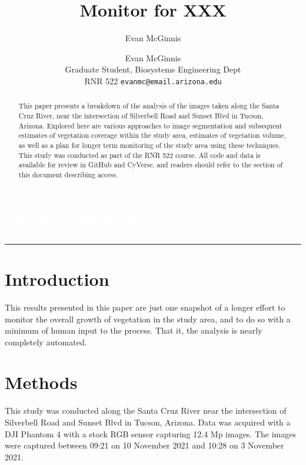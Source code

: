 \documentclass[letterpaper]{article}
\author{Evan McGinnis}
\title{Monitor for XXX}
\author{%
    Evan McGinnis \\
    Graduate Student, Biosystems Engineering Dept \\
    RNR 522
    \texttt{evanmc@email.arizona.edu}\vspace{40pt} \\
    }
\makeatletter
\def\printauthor{%
    {\large \@author}}
\makeatother
\begin{document}
\begin{titlepage}
\BgThispage
{}
\vspace*{1cm}
\noindent
\textcolor{white}{\Huge\textbf{\textsf{Vegetation Monitoring along the\\ Santa Cruz River}}}
\vspace*{2.5cm}\par
\noindent
\begin{minipage}{0.35\linewidth}
    \begin{flushright}
        \printauthor
    \end{flushright}
\end{minipage} \hspace{15pt}
%
\begin{minipage}{0.02\linewidth}
    \rule{1pt}{175pt}
\end{minipage} \hspace{-10pt}
%
\begin{minipage}{0.6\linewidth}
\vspace{5pt}
    \begin{abstract} 
This paper presents a breakdown of the analysis of the images taken along the Santa Cruz River, near the intersection of Silverbell Road and Sunset Blvd in Tucson, Arizona. Explored here are various approaches to image segmentation and subsequent estimates of vegetation coverage within the study area, estimates of vegetation volume, as well as a plan for longer term monitoring of the study area using these techniques. This study was conducted as part of the RNR 522 course. All code and data is available for review in GitHub and CyVerse, and readers should refer to the section of this document describing access.
    \end{abstract}
\end{minipage}
\end{titlepage}
\restoregeometry
%
%
\section{Introduction}
This results presented in this paper are just one snapshot of a longer effort to monitor the overall growth of vegetation in the study area, and to do so with a minimum of human input to the process. That it, the analysis is nearly completely automated.

%
%
\section{Methods}
This study was conducted along the Santa Cruz River near the intersection of Silverbell Road and Sunset Blvd in Tucson, Arizona. Data was acquired with a DJI Phantom 4 with a stock RGB sensor capturing 12.4 Mp images. The images were captured between 09:21 on 10 November 2021 and 10:28 on 3 November 2021.
\end{document}
